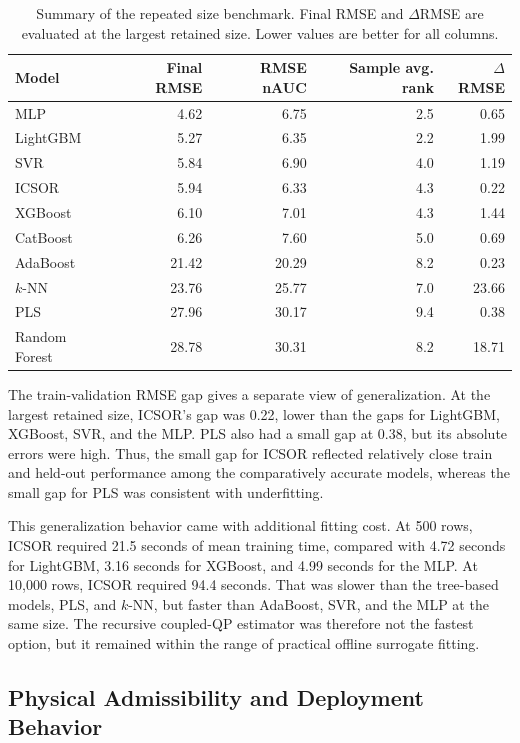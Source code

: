 \documentclass[12pt, twoside]{book}
\begin{document}
\begin{table}[htbp]
\centering
\caption[Repeated size benchmark summary for Chapter 3]{Summary of the repeated size benchmark. Final RMSE and \(\Delta\)RMSE are evaluated at the largest retained size. Lower values are better for all columns.}
\label{tab:ch3_scaling_summary}
\scriptsize
\setlength{\tabcolsep}{5pt}
\begin{tabular}{lrrrr}
\toprule
Model & Final RMSE & RMSE nAUC & Sample avg. rank & \(\Delta\)RMSE \\
\midrule
MLP & 4.62 & 6.75 & 2.5 & 0.65 \\
LightGBM & 5.27 & 6.35 & 2.2 & 1.99 \\
SVR & 5.84 & 6.90 & 4.0 & 1.19 \\
ICSOR & 5.94 & 6.33 & 4.3 & 0.22 \\
XGBoost & 6.10 & 7.01 & 4.3 & 1.44 \\
CatBoost & 6.26 & 7.60 & 5.0 & 0.69 \\
AdaBoost & 21.42 & 20.29 & 8.2 & 0.23 \\
\(k\)-NN & 23.76 & 25.77 & 7.0 & 23.66 \\
PLS & 27.96 & 30.17 & 9.4 & 0.38 \\
Random Forest & 28.78 & 30.31 & 8.2 & 18.71 \\
\bottomrule
\end{tabular}
\end{table}

The train-validation RMSE gap gives a separate view of generalization. At the largest retained size, ICSOR's
gap was 0.22, lower than the gaps for LightGBM, XGBoost, SVR, and the MLP. PLS also had a small gap at 0.38,
but its absolute errors were high. Thus, the small gap for ICSOR reflected relatively close train and held-out
performance among the comparatively accurate models, whereas the small gap for PLS was consistent with
underfitting.

This generalization behavior came with additional fitting cost. At 500 rows, ICSOR required 21.5 seconds of
mean training time, compared with 4.72 seconds for LightGBM, 3.16 seconds for XGBoost, and 4.99 seconds for the
MLP. At 10,000 rows, ICSOR required 94.4 seconds. That was slower than the tree-based models, PLS, and
\(k\)-NN, but faster than AdaBoost, SVR, and the MLP at the same size. The recursive coupled-QP estimator was
therefore not the fastest option, but it remained within the range of practical offline surrogate fitting.

\subsection{Physical Admissibility and Deployment Behavior}
\end{document}

